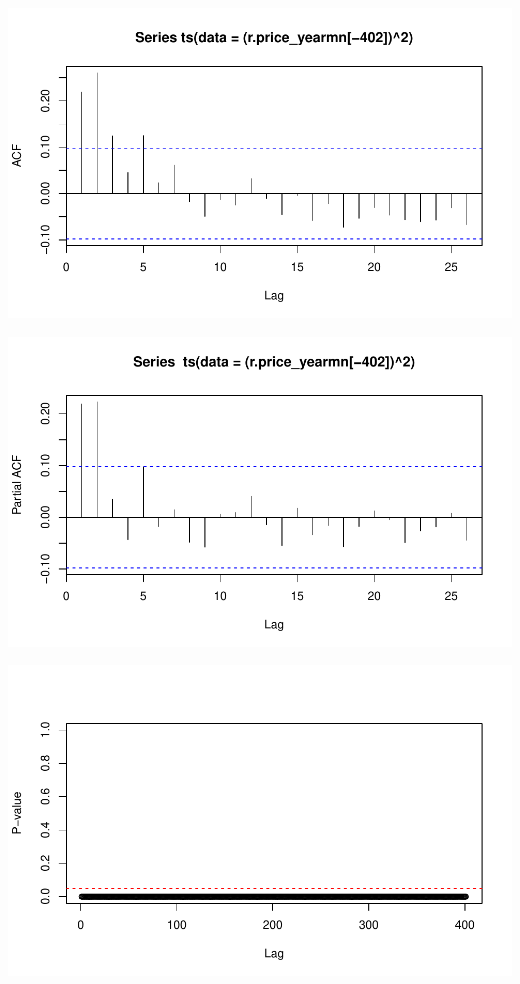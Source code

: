\documentclass[11pt]{article}\usepackage[]{graphicx}\usepackage[]{color}
\makeatletter
\def\maxwidth{ %
  \ifdim\Gin@nat@width>\linewidth
    \linewidth
  \else
    \Gin@nat@width
  \fi
}
\newenvironment{knitrout}{}{} %
\makeatother
\begin{document}
\begin{knitrout}
{}




{\centering \includegraphics[width=\maxwidth]{figure/abs_plots-13} 

}




{\centering \includegraphics[width=\maxwidth]{figure/abs_plots-14} 

}




{\centering \includegraphics[width=\maxwidth]{figure/abs_plots-15} 

}
\end{knitrout}
\end{document}
